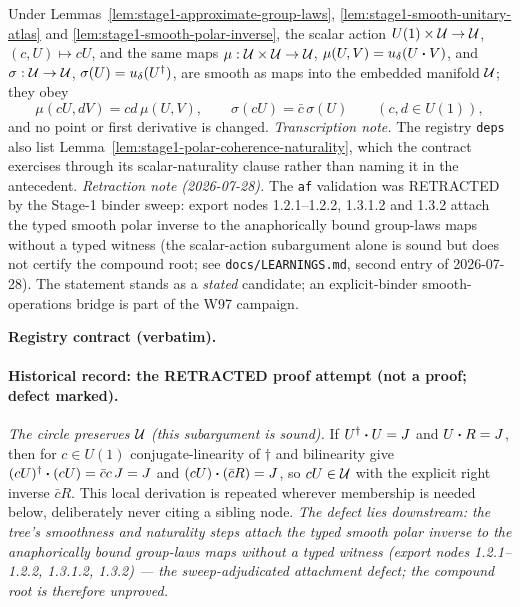 \begin{conjecture}\label{lem:stage1-smooth-unitary-operations}
Under Lemmas~\ref{lem:stage1-approximate-group-laws},
\ref{lem:stage1-smooth-unitary-atlas} and \ref{lem:stage1-smooth-polar-inverse}, the scalar
action $U(1)\times\mathcal U\to\mathcal U$, $(c,U)\mapsto cU$, and the same maps
$\mu:\mathcal U\times\mathcal U\to\mathcal U$, $\mu(U,V)=u_\delta(U\mathbin{\bm{\cdot}} V)$, and $\sigma:\mathcal U\to\mathcal U$,
$\sigma(U)=u_\delta(U^{\dagger})$, are smooth as maps into the embedded manifold $\mathcal U$; they
obey
\begin{equation}\label{eq:s1so-covariance}
  \mu(cU,dV)=cd\,\mu(U,V),\qquad \sigma(cU)=\bar c\,\sigma(U)
  \qquad(c,d\in U(1)),
\end{equation}
and no point or first derivative is changed.
\emph{Transcription note.} The registry \texttt{deps} also list
Lemma~\ref{lem:stage1-polar-coherence-naturality}, which the contract exercises through
its scalar-naturality clause rather than naming it in the antecedent.
\emph{Retraction note (2026-07-28).} The \texttt{af} validation was RETRACTED by the
Stage-1 binder sweep: export nodes 1.2.1--1.2.2, 1.3.1.2 and 1.3.2 attach the typed
smooth polar inverse to the anaphorically bound group-laws maps without a typed witness
(the scalar-action subargument alone is sound but does not certify the compound root; see
\texttt{docs/LEARNINGS.md}, second entry of 2026-07-28). The statement stands as a
\emph{stated} candidate; an explicit-binder smooth-operations bridge is part of the W97
campaign.
\end{conjecture}

\noindent\textbf{Registry contract (verbatim).}

\paragraph{Historical record: the RETRACTED proof attempt (not a proof; defect marked).}
\emph{The circle preserves $\mathcal U$ (this subargument is sound).} If $U^{\dagger}\mathbin{\bm{\cdot}} U=J$ and
$U\mathbin{\bm{\cdot}} R=J$, then for $c\in U(1)$ conjugate-linearity of $\dagger$ and bilinearity give
$(cU)^{\dagger}\mathbin{\bm{\cdot}}(cU)=\bar cc\,J=J$ and $(cU)\mathbin{\bm{\cdot}}(\bar cR)=J$, so $cU\in\mathcal U$ with the
explicit right inverse $\bar cR$. This local derivation is repeated wherever membership is
needed below, deliberately never citing a sibling node. \emph{The defect lies downstream:
the tree's smoothness and naturality steps attach the typed smooth polar inverse to the
anaphorically bound group-laws maps without a typed witness (export nodes
1.2.1--1.2.2, 1.3.1.2, 1.3.2) --- the sweep-adjudicated attachment defect; the compound
root is therefore unproved.}

